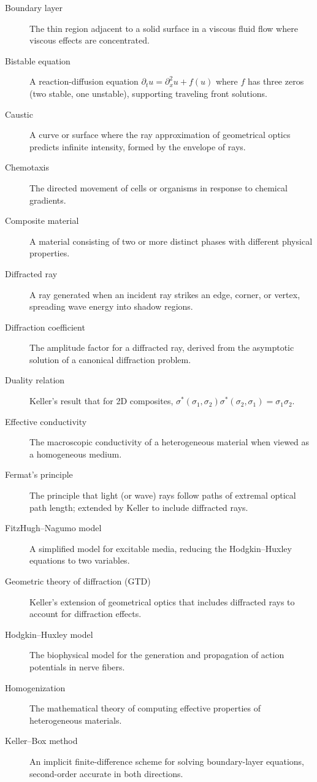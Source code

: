 \begin{description}
  \item[Boundary layer] The thin region adjacent to a solid surface in a viscous fluid flow where viscous effects are concentrated.
  \item[Bistable equation] A reaction-diffusion equation \(\partial_t u = \partial_x^2 u + f(u)\) where \(f\) has three zeros (two stable, one unstable), supporting traveling front solutions.
  \item[Caustic] A curve or surface where the ray approximation of geometrical optics predicts infinite intensity, formed by the envelope of rays.
  \item[Chemotaxis] The directed movement of cells or organisms in response to chemical gradients.
  \item[Composite material] A material consisting of two or more distinct phases with different physical properties.
  \item[Diffracted ray] A ray generated when an incident ray strikes an edge, corner, or vertex, spreading wave energy into shadow regions.
  \item[Diffraction coefficient] The amplitude factor for a diffracted ray, derived from the asymptotic solution of a canonical diffraction problem.
  \item[Duality relation] Keller's result that for 2D composites, \(\sigma^*(\sigma_1, \sigma_2) \sigma^*(\sigma_2, \sigma_1) = \sigma_1 \sigma_2\).
  \item[Effective conductivity] The macroscopic conductivity of a heterogeneous material when viewed as a homogeneous medium.
  \item[Fermat's principle] The principle that light (or wave) rays follow paths of extremal optical path length; extended by Keller to include diffracted rays.
  \item[FitzHugh--Nagumo model] A simplified model for excitable media, reducing the Hodgkin--Huxley equations to two variables.
  \item[Geometric theory of diffraction (GTD)] Keller's extension of geometrical optics that includes diffracted rays to account for diffraction effects.
  \item[Hodgkin--Huxley model] The biophysical model for the generation and propagation of action potentials in nerve fibers.
  \item[Homogenization] The mathematical theory of computing effective properties of heterogeneous materials.
  \item[Keller--Box method] An implicit finite-difference scheme for solving boundary-layer equations, second-order accurate in both directions.

\end{description}
